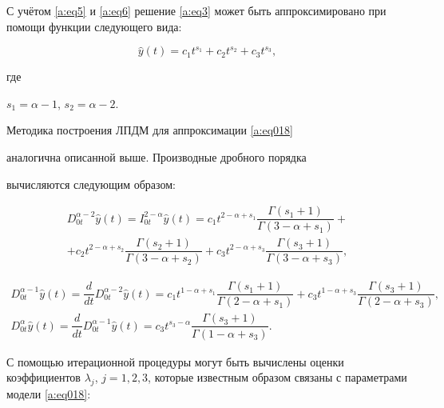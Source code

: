 С учётом \eqref{a:eq5} и \eqref{a:eq6} решение \eqref{a:eq3} может быть аппроксимировано при помощи функции следующего вида:

\begin{equation}\label{a:eq018}

\hat{y}(t)= c_1 t^{s_1}+c_2 t^{s_2}+c_3 t^{s_3},

\end{equation}

где

$s_1=\alpha-1$,  $s_2=\alpha-2.$





Методика построения ЛПДМ для аппроксимации \eqref{a:eq018}

аналогична описанной выше. Производные дробного порядка

вычисляются следующим образом:

\begin{multline}

D_{0t}^{\alpha-2}\hat{y}(t)=I_{0t}^{2-\alpha}\hat{y}(t)=c_1 t^{2-\alpha+s_1}\dfrac{\Gamma (s_1+1)}{\Gamma (3-\alpha+s_1)}+\\

+c_2 t^{2-\alpha+s_2}\dfrac{\Gamma (s_2+1)}{\Gamma (3-\alpha+s_2)}+c_3 t^{2-\alpha+s_3}\dfrac{\Gamma (s_3+1)}{\Gamma (3-\alpha+s_3)}

,

\end{multline}

\begin{gather}

D_{0t}^{\alpha-1}\hat{y}(t)=\dfrac{d}{dt} D_{0t}^{\alpha-2}\hat{y}(t)=c_1 t^{1-\alpha+s_1}\dfrac{\Gamma (s_1+1)}{\Gamma (2-\alpha+s_1)}+c_3 t^{1-\alpha+s_3}\dfrac{\Gamma (s_3+1)}{\Gamma (2-\alpha+s_3)},\\

D_{0t}^{\alpha}\hat{y}(t)=\dfrac{d}{dt} D_{0t}^{\alpha-1}\hat{y}(t)=

c_3 t^{s_3-\alpha}\dfrac{\Gamma (s_3+1)}{\Gamma (1-\alpha+s_3)}.


\end{gather}





С помощью итерационной процедуры могут быть вычислены оценки коэффициентов $\lambda_j$, $j=1, 2, 3$, которые известным образом связаны с параметрами модели \eqref{a:eq018}:

